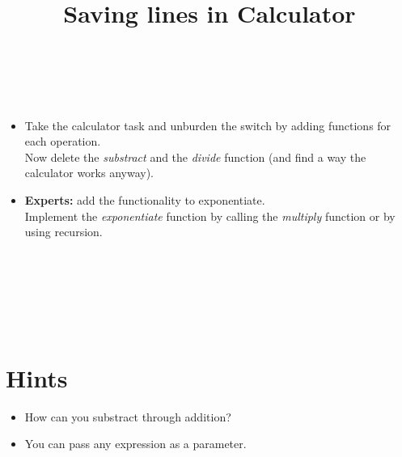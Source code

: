 


\title{Saving lines in Calculator} %
\author{} %
\renewcommand{\difficulty}{Easy} %
\renewcommand{\requirements}{Functions} %
\renewcommand{\aims}{Write clear code, abstract} %


 \maketitle
 \taskinfos

\ \\\ \\
\begin{itemize}
	\item Take the calculator task and unburden the switch by adding functions for each operation.\\
	Now delete the \textit{substract} and the \textit{divide} function (and find a way the calculator works anyway).
	\item \textbf{Experts:} add the functionality to exponentiate.\\
	Implement the \textit{exponentiate} function by calling the \textit{multiply} function or by using recursion.
\end{itemize}	
 
 
\ \\\ \\\ \\\ \\\ \\
\section*{Hints}
	\begin{itemize}
		\item How can you substract through addition?
		\item You can pass any expression as a parameter.
	\end{itemize}
 

